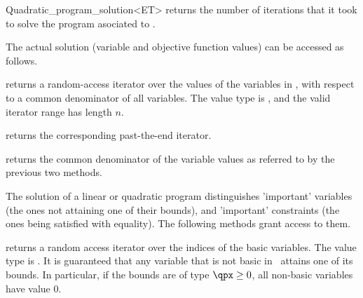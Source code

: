 \begin{ccRefClass}{Quadratic_program_solution<ET>}
{returns the number of iterations that it took to solve the 
program asociated to \ccVar.}

The actual solution (variable and objective function values) can be
accessed as follows.






{returns a random-access iterator  over the values 
of the variables in \ccVar, with respect to a common
denominator of all variables. The value type is , and the valid
iterator range has length $n$.}

{returns the corresponding past-the-end iterator.}

{returns the common denominator of the variable values as referred to
by the previous two methods.}

The solution of a linear or quadratic program distinguishes 'important'
variables (the ones not attaining one of their bounds), and 'important'
constraints (the ones being satisfied with equality). The following
methods grant access to them.

{returns a random access iterator over the indices of the basic
variables. The value type is . It is guaranteed that any 
variable that is not basic in \ccVar\ attains one of its bounds. 
In particular, if the bounds are of type $\qpx\geq 0$, all non-basic 
variables have value $0$.}


\end{ccRefClass}
